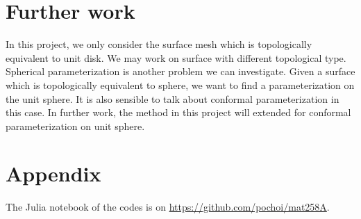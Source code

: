 \documentclass{article} %
\begin{document}
\section{Further work}

In this project, we only consider the surface mesh which is topologically equivalent to unit disk. We may work on surface with different topological type. Spherical parameterization is another problem we can investigate. Given a surface which is topologically equivalent to sphere, we want to find a parameterization on the unit sphere. It is also sensible to talk about conformal parameterization in this case. In further work, the method in this project will extended for conformal parameterization on unit sphere.





\section{Appendix}

The Julia notebook of the codes is on \url{https://github.com/pochoi/mat258A}.
\end{document}
